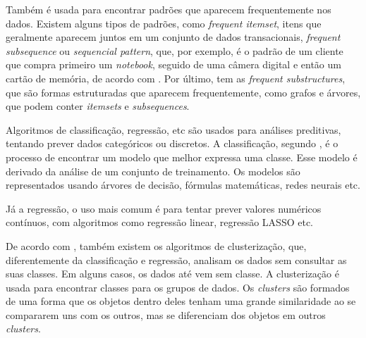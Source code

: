 Também é usada para encontrar padrões que aparecem frequentemente nos dados. Existem alguns tipos de padrões, como \textit{frequent itemset}, itens que geralmente aparecem juntos em um conjunto de dados transacionais, \textit{frequent subsequence} ou \textit{sequencial pattern}, que, por exemplo, é o padrão de um cliente que compra primeiro um \textit{notebook}, seguido de uma câmera digital e então um cartão de memória, de acordo com . Por último, tem as \textit{frequent substructures}, que são formas estruturadas que aparecem frequentemente, como grafos e árvores, que podem conter \textit{itemsets} e \textit{subsequences}.

Algoritmos de classificação, regressão, etc são usados para análises preditivas, tentando prever dados categóricos ou discretos. A classificação, segundo , é o processo de encontrar um modelo que melhor expressa uma classe. Esse modelo é derivado da análise de um conjunto de treinamento. Os modelos são representados usando árvores de decisão, fórmulas matemáticas, redes neurais etc.

Já a regressão, o uso mais comum é para tentar prever valores numéricos contínuos, com algoritmos como regressão linear, regressão LASSO etc.

De acordo com , também existem os algoritmos de clusterização, que, diferentemente da classificação e regressão, analisam os dados sem consultar as suas classes. Em alguns casos, os dados até vem sem classe. A clusterização é usada para encontrar classes para os grupos de dados. Os \textit{clusters} são formados de uma forma que os objetos dentro deles tenham uma grande similaridade ao se compararem uns com os outros, mas se diferenciam dos objetos em outros \textit{clusters}.
